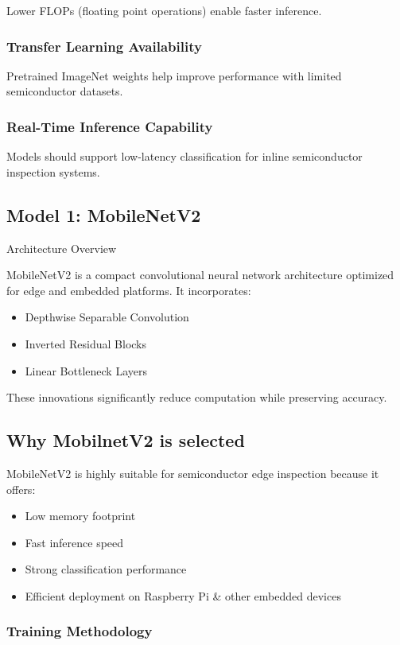 Lower FLOPs (floating point operations) enable faster inference.

\subsubsection{Transfer Learning Availability}

Pretrained ImageNet weights help improve performance with limited semiconductor datasets.

\subsubsection{Real-Time Inference Capability}

Models should support low-latency classification for inline semiconductor inspection systems.

\subsection{Model 1: MobileNetV2}
Architecture Overview

MobileNetV2 is a compact convolutional neural network architecture optimized for edge and embedded platforms. It incorporates:

\begin{itemize}
   \item Depthwise Separable Convolution
   \item Inverted Residual Blocks
   \item Linear Bottleneck Layers
\end{itemize}
These innovations significantly reduce computation while preserving accuracy.

\subsection{Why MobilnetV2 is selected}
MobileNetV2 is highly suitable for semiconductor edge inspection because it offers:
\begin{itemize}
\item Low memory footprint
\item Fast inference speed
\item Strong classification performance
\item Efficient deployment on Raspberry Pi \& other embedded devices
\end{itemize}

\subsubsection{ Training Methodology}


